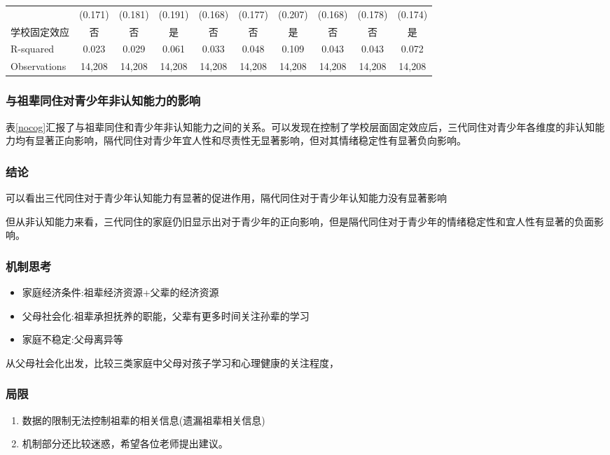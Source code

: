 \documentclass{beamer}
\begin{document}
\begin{frame}
\begin{table}[!htbp]
{\begin{tabular}{lccccccccc}
             & (0.171)    & (0.181)    & (0.191)    & (0.168)    & (0.177)    & (0.207)   & (0.168)    & (0.178)    & (0.174)   \\
学校固定效应  & 否    	& 否     	& 是 			& 否    	 	& 否     	 & 是    		& 否    		& 否     	& 是  \\
R-squared    & 0.023      & 0.029      & 0.061      & 0.033      & 0.048      & 0.109     & 0.043      & 0.043      & 0.072    \\
Observations & 14,208     & 14,208     & 14,208     & 14,208     & 14,208     & 14,208    & 14,208     & 14,208     & 14,208    \\
\hline
\end{tabular}} %
\end{table}	
\end{frame}

\begin{frame}
	\frametitle{与祖辈同住对青少年非认知能力的影响}
表\ref{nocog}汇报了与祖辈同住和青少年非认知能力之间的关系。可以发现在控制了学校层面固定效应后，三代同住对青少年各维度的非认知能力均有显著正向影响，隔代同住对青少年宜人性和尽责性无显著影响，但对其情绪稳定性有显著负向影响。
\end{frame}


\begin{frame}
	\frametitle{结论}
可以看出三代同住对于青少年认知能力有显著的促进作用，隔代同住对于青少年认知能力没有显著影响
\par 但从非认知能力来看，三代同住的家庭仍旧显示出对于青少年的正向影响，但是隔代同住对于青少年的情绪稳定性和宜人性有显著的负面影响。
\end{frame}



\begin{frame}
	\frametitle{机制思考}
	\begin{itemize}
		\item 家庭经济条件:祖辈经济资源+父辈的经济资源
		\item 父母社会化:祖辈承担抚养的职能，父辈有更多时间关注孙辈的学习
		\item 家庭不稳定:父母离异等
	\end{itemize}
	从父母社会化出发，比较三类家庭中父母对孩子学习和心理健康的关注程度，
\end{frame}




\begin{frame}
	\frametitle{局限}
	\begin{enumerate}
		\item 数据的限制无法控制祖辈的相关信息(遗漏祖辈相关信息)
		\item 机制部分还比较迷惑，希望各位老师提出建议。
	\end{enumerate}
\end{frame}
\end{document}
